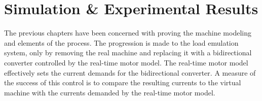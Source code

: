 \chapter{Simulation \& Experimental Results}
The previous chapters have been concerned with proving the machine modeling and elements of the process. The progression is made to the load emulation system, only by removing the real machine and replacing it with a bidirectional converter controlled by the real-time motor model. The real-time motor model effectively sets the current demands for the bidirectional converter. A measure of the success of this control is to compare the resulting currents to the virtual machine with the currents demanded by the real-time motor model. 
